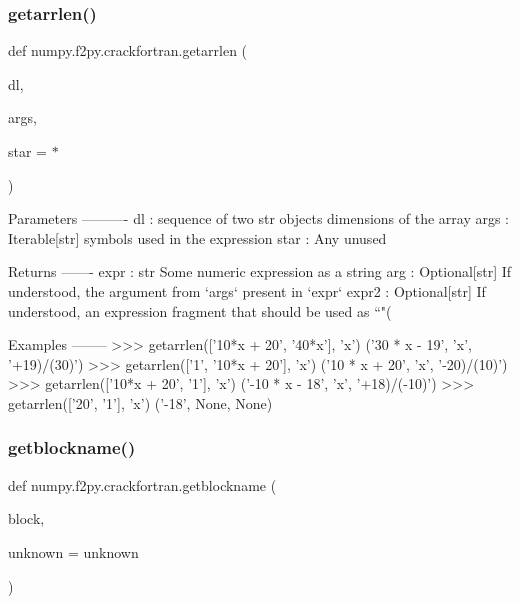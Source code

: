 \mbox{\label{namespacenumpy_1_1f2py_1_1crackfortran_a6ba36bc9a1b76a211697c6b74848b127}} 
\subsubsection{\texorpdfstring{getarrlen()}{getarrlen()}}
{\footnotesize\ttfamily def numpy.\+f2py.\+crackfortran.\+getarrlen (\begin{DoxyParamCaption}\item[{}]{dl,  }\item[{}]{args,  }\item[{}]{star = {\ttfamily \textquotesingle{}$\ast$\textquotesingle{}} }\end{DoxyParamCaption})}

\begin{DoxyVerb}Parameters
----------
dl : sequence of two str objects
    dimensions of the array
args : Iterable[str]
    symbols used in the expression
star : Any
    unused

Returns
-------
expr : str
    Some numeric expression as a string
arg : Optional[str]
    If understood, the argument from `args` present in `expr`
expr2 : Optional[str]
    If understood, an expression fragment that should be used as
    ``"(%

Examples
--------
>>> getarrlen(['10*x + 20', '40*x'], {'x'})
('30 * x - 19', 'x', '+19)/(30)')
>>> getarrlen(['1', '10*x + 20'], {'x'})
('10 * x + 20', 'x', '-20)/(10)')
>>> getarrlen(['10*x + 20', '1'], {'x'})
('-10 * x - 18', 'x', '+18)/(-10)')
>>> getarrlen(['20', '1'], {'x'})
('-18', None, None)
\end{DoxyVerb}
 \mbox{\label{namespacenumpy_1_1f2py_1_1crackfortran_a82040997fd5fcab1991ccc0e70663cfe}} 
\subsubsection{\texorpdfstring{getblockname()}{getblockname()}}
{\footnotesize\ttfamily def numpy.\+f2py.\+crackfortran.\+getblockname (\begin{DoxyParamCaption}\item[{}]{block,  }\item[{}]{unknown = {\ttfamily \textquotesingle{}unknown\textquotesingle{}} }\end{DoxyParamCaption})}

